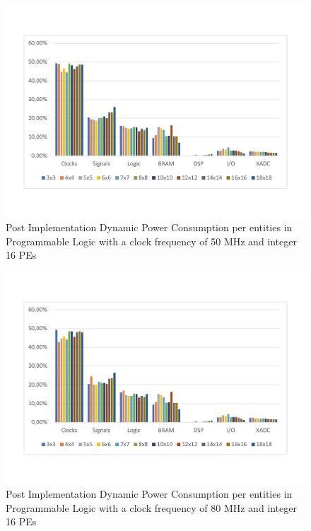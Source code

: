 \begin{figure}[!htbp]
\centering
\captionsetup{justification=centering}
\includegraphics[scale=0.6,angle=0]{./figure/graphs/power_pldyn_div_int16_freq_50mhz.pdf}
\caption{Post Implementation Dynamic Power Consumption per entities in Programmable Logic with a clock frequency of 50 MHz and integer 16 PEs}
\label{fig:dynpowint16ent50}
\end{figure}
\begin{figure}[!htbp]
\centering
\captionsetup{justification=centering}
\includegraphics[scale=0.6,angle=0]{./figure/graphs/power_pldyn_div_int16_freq_80mhz.pdf}
\caption{Post Implementation Dynamic Power Consumption per entities in Programmable Logic with a clock frequency of 80 MHz and integer 16 PEs}
\label{fig:dynpowint16ent80}
\end{figure}

